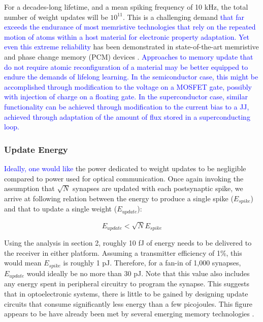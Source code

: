 \documentclass[twocolumn]{article}
\begin{document}
For a decades-long lifetime, and a mean spiking frequency of 10 kHz, the total number of weight updates will be $10^{11}$. This is a challenging demand \textcolor{blue}{that far exceeds the endurance of most memristive technologies that rely on the repeated motion of atoms within a host material for electronic property adaptation. Yet even this extreme reliability} has been demonstrated in state-of-the-art memristive and phase change memory (PCM) devices \cite{zhao2020reliability}. \textcolor{blue}{Approaches to memory update that do not require atomic reconfiguration of a material may be better equipped to endure the demands of lifelong learning. In the semiconductor case, this might be accomplished through modification to the voltage on a MOSFET gate, possibly with injection of charge on a floating gate. In the superconductor case, similar functionality can be achieved through modification to the current bias to a JJ, achieved through adaptation of the amount of flux stored in a superconducting loop.}

\subsubsection{Update Energy}
\textcolor{blue}{Ideally, one would like} the power dedicated to weight updates to be negligible compared to power used for optical communication. Once again invoking the assumption that $\sqrt{N}$ synapses are updated with each postsynaptic spike, we arrive at following relation between the energy to produce a single spike ($E_{spike}$) and that to update a single weight ($E_{update}$):

\begin{equation}
    E_{update} < \sqrt{N}E_{spike}
\end{equation}

Using the analysis in section 2, roughly 10 fJ of energy needs to be delivered to the receiver in either platform. Assuming a transmitter efficiency of 1\%, this would mean $E_{spike}$ is roughly 1 pJ. Therefore, for a fan-in of 1,000 synapses, $E_{update}$ would ideally be no more than 30 pJ. Note that this value also includes any energy spent in peripheral circuitry to program the synapse. This suggests that in optoelectronic systems, there is little to be gained by designing update circuits that consume significantly less energy than a few picojoules. This figure appears to be have already been met by several emerging memory technologies \cite{zahoor2020resistive}.
\end{document}
